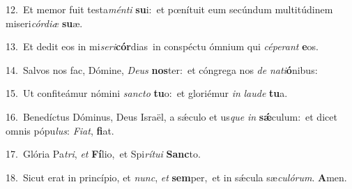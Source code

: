 {\numbfont\textcolor{\numbcolor}{12.}}~Et memor fuit testa\-\textit{mén}\-\textit{ti} \textbf{su}\-i:~\star et pœnítuit eum secúndum multitúdinem miseri\-\textit{cór}\-\textit{di}\textit{æ} \textbf{su}\-æ.\par
{\numbfont\textcolor{\numbcolor}{13.}}~Et dedit eos in mi\-\textit{se}\-\textit{ri}\textbf{cór}dias~\star in conspéctu ómnium qui \textit{cé}\-\textit{pe}\textit{rant} \textbf{e}\-os.\par
{\numbfont\textcolor{\numbcolor}{14.}}~Salvos nos fac, Dómine, \textit{De}\-\textit{us} \textbf{nos}\-ter:~\star et cóngrega nos \textit{de} \textit{na}\-\textit{ti}\textbf{ó}nibus:\par
{\numbfont\textcolor{\numbcolor}{15.}}~Ut confiteámur nómini \textit{sanc}\-\textit{to} \textbf{tu}\-o:~\star et gloriémur \textit{in} \textit{lau}\-\textit{de} \textbf{tu}\-a.\par
{\numbfont\textcolor{\numbcolor}{16.}}~Benedíctus Dóminus, Deus Israël, a sǽculo et us\textit{que} \textit{in} \textbf{sǽ}\-culum:~\star et dicet omnis pópu\-\textit{lus}\-: \textit{Fi}\-\textit{at}, \textbf{fi}\-at.\par
{\numbfont\textcolor{\numbcolor}{17.}}~Glória Pa\-\textit{tri}\-, \textit{et} \textbf{Fí}\-lio,~\star et Spi\-\textit{rí}\-\textit{tu}\textit{i} \textbf{Sanc}\-to.\par
{\numbfont\textcolor{\numbcolor}{18.}}~Sicut erat in princípio, et \textit{nunc}\-, \textit{et} \textbf{sem}\-per,~\star et in sǽcula sæ\-\textit{cu}\-\textit{ló}\textit{rum}. \textbf{A}\-men.\par
